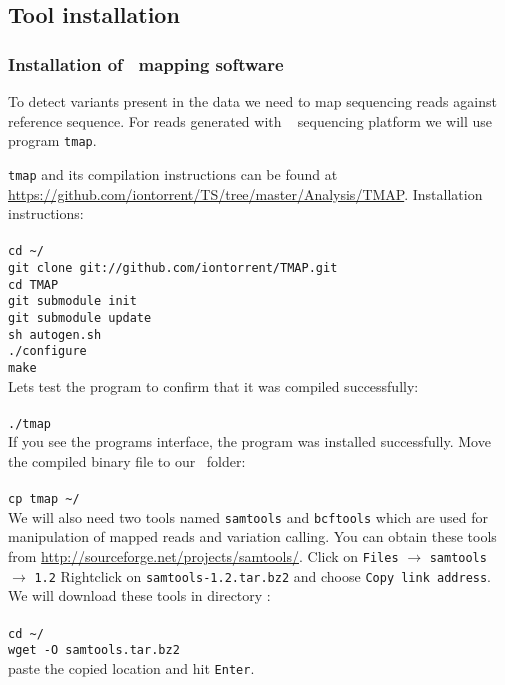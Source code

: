 \subsection{Tool installation}
\subsubsection{Installation of \IonTorrent~mapping software}
To detect variants present in the data we need to map sequencing
reads against reference sequence. For reads generated with \IonTorrent~
sequencing platform we will use program \texttt{tmap}.

\texttt{tmap} and its compilation instructions can
be found at \url{https://github.com/iontorrent/TS/tree/master/Analysis/TMAP}.
Installation instructions:\\~\\
\texttt{cd \textasciitilde/\progDir}\\
\texttt{git clone git://github.com/iontorrent/TMAP.git}\\
\texttt{cd TMAP}\\
\texttt{git submodule init}\\
\texttt{git submodule update}\\
\texttt{sh autogen.sh}\\
\texttt{./configure}\\
\texttt{make}\\

Lets test the program to confirm that it was compiled successfully:\\~\\
\texttt{./tmap}\\

If you see the programs interface, the program was installed successfully.
Move the compiled binary file to our \texttt{\binDir}~folder:\\~\\
\texttt{cp tmap \textasciitilde/\binDir}\\

We will also need two tools named \texttt{samtools} and \texttt{bcftools} which are used for
manipulation of mapped reads and variation calling. You can obtain these tools from
\url{http://sourceforge.net/projects/samtools/}. Click on \texttt{Files} $\rightarrow$ \texttt{samtools} $\rightarrow$ \texttt{1.2}
Rightclick on \texttt{samtools-1.2.tar.bz2} and choose \texttt{Copy link address}. 
We will download these tools in directory \texttt{\progDir}:\\~\\
\texttt{cd \textasciitilde/\progDir}\\
\texttt{wget -O samtools.tar.bz2}\\
paste the copied location and hit \texttt{Enter}.

